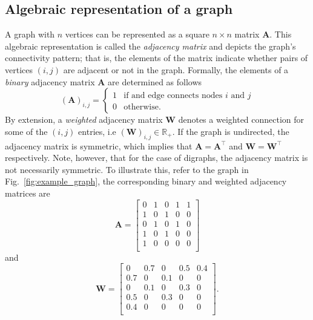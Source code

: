 \subsection{Algebraic representation of a graph}
A graph with $n$ vertices can be represented as a square $n\times n$ matrix $\bm{A}$. This algebraic representation is called the \emph{adjacency matrix} and depicts the graph's connectivity pattern; that is, the elements of the matrix indicate whether pairs of vertices $\left(i,j\right)$ are adjacent or not in the graph. Formally,
the elements of a \emph{binary} adjacency matrix $\bm{A}$ are determined as follows
\begin{equation}
	\left(\bm{A}\right)_{i,j} =
	\begin{cases}
		1 & \text{if and edge connects nodes $i$ and $j$}\\
		0 & \text{otherwise}.
	\end{cases}
\end{equation}
By extension, a \emph{weighted} adjacency matrix $\bm{W}$ denotes a weighted connection for some of the $\left(i,j\right)$ entries, i.e $\left(\bm{W}\right)_{i,j} \in \mathbb{R}_+$. If the graph is undirected, the adjacency matrix is symmetric, which implies that $\bm{A}=\bm{A}^\intercal$ and $\bm{W}=\bm{W}^\intercal$respectively. Note, however, that for the case of digraphs, the adjacency matrix is not necessarily symmetric. To illustrate this, refer to the graph in Fig.~\ref{fig:example_graph}, the corresponding binary and weighted adjacency matrices are
\begin{equation*}
	\bm{A} = \begin{bmatrix}
		0 & 1 & 0 & 1 & 1\\
		1 & 0 & 1 & 0 & 0\\
		0 & 1 & 0 & 1 & 0\\
		1 & 0 & 1 & 0 & 0\\
		1 & 0 & 0 & 0 & 0\\
	\end{bmatrix}
\end{equation*} 
and
\begin{equation*}
	\bm{W} = \begin{bmatrix}
		0 & 0.7 & 0 & 0.5 & 0.4\\
		0.7 & 0 & 0.1 & 0 & 0\\
		0 & 0.1 & 0 & 0.3 & 0\\
		0.5 & 0 & 0.3 & 0 & 0\\
		0.4 & 0 & 0 & 0 & 0\\
	\end{bmatrix}.
\end{equation*} 
